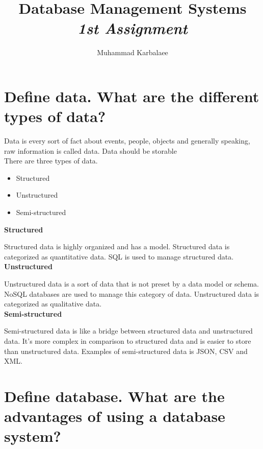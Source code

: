 \documentclass[twocolumn,a4paper, 10pt]{article}
\title{\textbf{Database Management Systems} \\ \emph{1st Assignment}}
\author{Muhammad Karbalaee}
\begin{document}
	\maketitle
    \section{Define data. What are the different types of data?}
    
        Data is every sort of fact about events, people, objects and generally 
        speaking, raw information is called data. Data should be storable \\
        There are three types of data.
        \begin{itemize}
            \item Structured 
            \item Unstructured 
            \item Semi-structured
        \end{itemize}
        \textbf{Structured}

            Structured data is highly organized and has a model. Structured data is categorized as 
            quantitative data. SQL is used to manage structured data.\\
        \textbf{Unstructured}
        
            Unstructured data is a sort of data that is not preset by a data model or schema. NoSQL databases
            are used to manage this category of data. Unstructured data is categorized as qualitative data.\\ 
        \textbf{Semi-structured}

        Semi-structured data is like a bridge between structured data and unstructured data. It's more 
        complex in comparison to structured data and is easier to store than unstructured data. 
        Examples of semi-structured data is JSON, CSV and XML.\\ 

    \section{Define database. What are the advantages of using a database system?}
\end{document}
